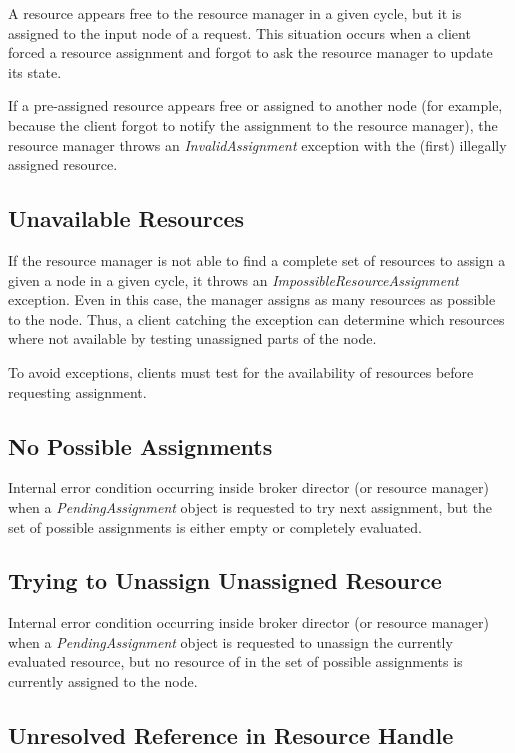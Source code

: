 \documentclass[a4paper,twoside]{tce}
\begin{document}
A resource appears free to the resource manager in a given cycle, but it is
assigned to the input node of a request. This situation occurs when a client
forced a resource assignment and forgot to ask the resource manager to
update its state.

If a pre-assigned resource appears free or assigned to another node
(for example, because the client forgot to notify the assignment to the
resource manager), the resource manager throws an \emph{InvalidAssignment}
exception with the (first) illegally assigned resource.

\subsection{Unavailable Resources}

If the resource manager is not able to find a complete set of resources to
assign a given a node in a given cycle, it throws an
\emph{ImpossibleResourceAssignment} exception. Even in this case, the
manager assigns as many resources as possible to the node.
%
%
Thus, a client catching the exception can determine which resources where
not available by testing unassigned parts of the node.

To avoid exceptions, clients must test for the availability of resources
before requesting assignment.

\subsection{No Possible Assignments}
\label{ssec:no-possible-assignments}

Internal error condition occurring inside broker director (or resource
manager) when a \emph{PendingAssignment} object is requested to try next
assignment, but the set of possible assignments is either empty or
completely evaluated.

\subsection{Trying to Unassign Unassigned Resource}
\label{ssec:impossible-unassign}

Internal error condition occurring inside broker director (or resource
manager) when a \emph{PendingAssignment} object is requested to unassign the
currently evaluated resource, but no resource of in the set of possible
assignments is currently assigned to the node.

\subsection{Unresolved Reference in Resource Handle}
\label{ssec:unresolved-resource}
\end{document}
